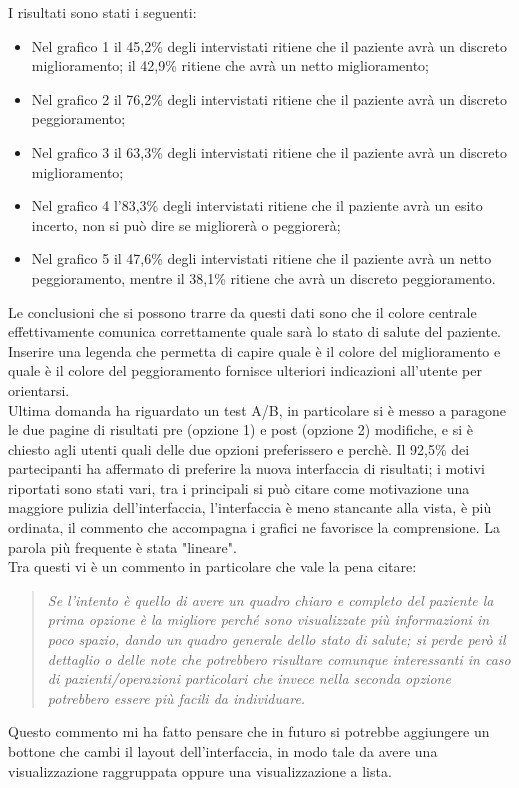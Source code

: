 I risultati sono stati i seguenti:
\begin{itemize}
    \item Nel grafico 1 il 45,2\% degli intervistati ritiene che il paziente avrà un discreto miglioramento; il 42,9\% ritiene che avrà un netto miglioramento;
    \item Nel grafico 2 il 76,2\% degli intervistati ritiene che il paziente avrà un discreto peggioramento;
    \item Nel grafico 3 il 63,3\% degli intervistati ritiene che il paziente avrà un discreto miglioramento;
    \item Nel grafico 4 l'83,3\% degli intervistati ritiene che il paziente avrà un esito incerto, non si può dire se migliorerà o peggiorerà;
    \item Nel grafico 5 il 47,6\% degli intervistati ritiene che il paziente avrà un netto peggioramento, mentre il 38,1\% ritiene che avrà un discreto peggioramento.
\end{itemize}
Le conclusioni che si possono trarre da questi dati sono che il colore centrale effettivamente comunica correttamente quale sarà lo stato di salute del paziente. Inserire una legenda che permetta di capire quale è il colore del miglioramento e quale è il colore del peggioramento fornisce ulteriori indicazioni all'utente per orientarsi. \\

Ultima domanda ha riguardato un test A/B, in particolare si è messo a paragone le due pagine di risultati pre (opzione 1) e post (opzione 2) modifiche, e si è chiesto agli utenti quali delle due opzioni preferissero e perchè. Il 92,5\% dei partecipanti ha affermato di preferire la nuova interfaccia di risultati; i motivi riportati sono stati vari, tra i principali si può citare come motivazione una maggiore pulizia dell'interfaccia, l'interfaccia è meno stancante alla vista, è più ordinata, il commento che accompagna i grafici ne favorisce la comprensione. La parola più frequente è stata "lineare". \\
Tra questi vi è un commento in particolare che vale la pena citare: 
\begin{quote}
    \textit{Se l'intento è quello di avere un quadro chiaro e completo del paziente la prima opzione è la migliore perché sono visualizzate più informazioni in poco spazio, dando un quadro generale dello stato di salute; si perde però il dettaglio o delle note che potrebbero risultare comunque interessanti in caso di pazienti/operazioni particolari che invece nella seconda opzione potrebbero essere più facili da individuare.}
\end{quote}
Questo commento mi ha fatto pensare che in futuro si potrebbe aggiungere un bottone che cambi il layout dell'interfaccia, in modo tale da avere una visualizzazione raggruppata oppure una visualizzazione a lista.